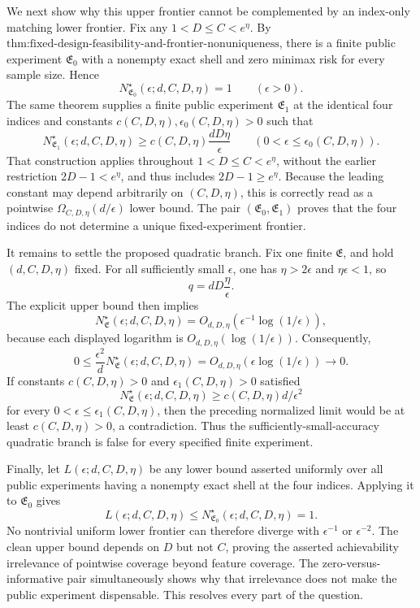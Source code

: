 We next show why this upper frontier cannot be complemented by an index-only matching lower frontier. Fix any \(1<D\le C<e^\eta\). By \(\text{thm:fixed-design-feasibility-and-frontier-nonuniqueness}\), there is a finite public experiment \(\mathfrak E_0\) with a nonempty exact shell and zero minimax risk for every sample size. Hence
\[
N^\star_{\mathfrak E_0}(\epsilon;d,C,D,\eta)=1
\qquad(\epsilon>0).
\]
The same theorem supplies a finite public experiment \(\mathfrak E_1\) at the identical four indices and constants \(c(C,D,\eta),\epsilon_0(C,D,\eta)>0\) such that
\[
N^\star_{\mathfrak E_1}(\epsilon;d,C,D,\eta)
\ge c(C,D,\eta)\frac{dD\eta}{\epsilon}
\qquad(0<\epsilon\le\epsilon_0(C,D,\eta)).
\]
That construction applies throughout \(1<D\le C<e^\eta\), without the earlier restriction \(2D-1<e^\eta\), and thus includes \(2D-1\ge e^\eta\). Because the leading constant may depend arbitrarily on \((C,D,\eta)\), this is correctly read as a pointwise \(\Omega_{C,D,\eta}(d/\epsilon)\) lower bound. The pair \((\mathfrak E_0,\mathfrak E_1)\) proves that the four indices do not determine a unique fixed-experiment frontier.

It remains to settle the proposed quadratic branch. Fix one finite \(\mathfrak E\), and hold \((d,C,D,\eta)\) fixed. For all sufficiently small \(\epsilon\), one has \(\eta>2\epsilon\) and \(\eta\epsilon<1\), so
\[
q=dD\frac{\eta}{\epsilon}.
\]
The explicit upper bound then implies
\[
N^\star_{\mathfrak E}(\epsilon;d,C,D,\eta)
=O_{d,D,\eta}\!\left(\epsilon^{-1}\log(1/\epsilon)\right),
\]
because each displayed logarithm is \(O_{d,D,\eta}(\log(1/\epsilon))\). Consequently,
\[
0\le
\frac{\epsilon^2}{d}N^\star_{\mathfrak E}(\epsilon;d,C,D,\eta)
=O_{d,D,\eta}\!\left(\epsilon\log(1/\epsilon)\right)
\longrightarrow0.
\]
If constants \(c(C,D,\eta)>0\) and \(\epsilon_1(C,D,\eta)>0\) satisfied
\[
N^\star_{\mathfrak E}(\epsilon;d,C,D,\eta)
\ge c(C,D,\eta)d/\epsilon^2
\]
for every \(0<\epsilon\le\epsilon_1(C,D,\eta)\), then the preceding normalized limit would be at least \(c(C,D,\eta)>0\), a contradiction. Thus the sufficiently-small-accuracy quadratic branch is false for every specified finite experiment.

Finally, let \(L(\epsilon;d,C,D,\eta)\) be any lower bound asserted uniformly over all public experiments having a nonempty exact shell at the four indices. Applying it to \(\mathfrak E_0\) gives
\[
L(\epsilon;d,C,D,\eta)
\le N^\star_{\mathfrak E_0}(\epsilon;d,C,D,\eta)=1.
\]
No nontrivial uniform lower frontier can therefore diverge with \(\epsilon^{-1}\) or \(\epsilon^{-2}\). The clean upper bound depends on \(D\) but not \(C\), proving the asserted achievability irrelevance of pointwise coverage beyond feature coverage. The zero-versus-informative pair simultaneously shows why that irrelevance does not make the public experiment dispensable. This resolves every part of the question.